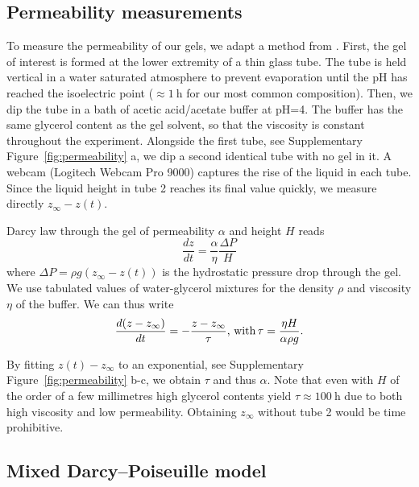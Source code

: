 \documentclass[twocolumn,superscriptaddress,showpacs,preprintnumbers,
amsmath,amssymb,prl]{revtex4-1}
\begin{document}
\subsection*{Permeability measurements}

To measure the permeability of our gels, we adapt a method from \cite{VanDijk1986}. First, the gel of interest is formed at the lower extremity of a thin glass tube. The tube is held vertical in a water saturated atmosphere to prevent evaporation until the pH has reached the isoelectric point ($\approx\SI{1}{\hour}$ for our most common composition). Then, we dip the tube in a bath of acetic acid/acetate buffer at pH=4. The buffer has the same glycerol content as the gel solvent, so that the viscosity is constant throughout the experiment. Alongside the first tube, see Supplementary Figure~\ref{fig:permeability} a, we dip a second identical tube with no gel in it. A webcam (Logitech Webcam Pro 9000) captures the rise of the liquid in each tube. Since the liquid height in tube 2 reaches its final value quickly, we measure directly $z_\infty-z(t)$.

Darcy law through the gel of permeability $\alpha$ and height $H$ reads 
\begin{equation}
\frac{dz}{dt} = \frac{\alpha}{\eta}\frac{\Delta P}{H}
\end{equation}
where $\Delta P=\rho g(z_\infty-z(t))$ is the hydrostatic pressure drop through the gel. We use tabulated values of water-glycerol mixtures for the density $\rho$ and viscosity $\eta$ of the buffer. We can thus write
\begin{equation}
\frac{d(z-z_\infty)}{dt} = -\frac{z-z_\infty}{\tau}\text{, with\,} \tau = \frac{\eta H}{\alpha \rho g}.
\end{equation}

By fitting $z(t)-z_\infty$ to an exponential, see Supplementary Figure~\ref{fig:permeability} b-c, we obtain $\tau$ and thus $\alpha$. Note that even with $H$ of the order of a few millimetres high glycerol contents yield $\tau\approx \SI{100}{\hour}$ due to both high viscosity and low permeability. Obtaining $z_\infty$ without tube 2 would be time prohibitive.









\subsection*{Mixed Darcy--Poiseuille model}
\end{document}
